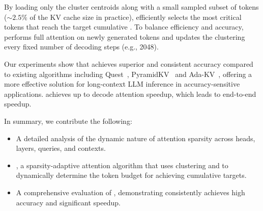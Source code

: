 By loading only the cluster centroids along with a small sampled subset of tokens ($\sim2.5\%$ of the KV cache size in practice), \sys efficiently selects the most critical tokens that reach the target cumulative \as{}. To balance efficiency and accuracy, \sys performs full attention on newly generated tokens and updates the clustering every fixed number of decoding steps (e.g., 2048).



Our experiments show that \sys achieves superior and consistent accuracy compared to existing algorithms including Quest~\cite{tang2024questqueryawaresparsityefficient}, PyramidKV~\cite{cai2024pyramidkvdynamickvcache} and Ada-KV~\cite{feng2024adakvoptimizingkvcache}, offering a more effective solution for long-context LLM inference in accuracy-sensitive applications. \sys achieves up to \attnspeedup decode attention speedup, which leads to \etoespeedup end-to-end speedup.

In summary, we contribute the following:
\begin{itemize}
    \item A detailed analysis of the dynamic nature of attention sparsity across heads, layers, queries, and contexts.
    \item \textbf{\sys}, a sparsity-adaptive attention algorithm that uses clustering and \df to dynamically determine the token budget for achieving cumulative \as{} targets. %
    \item A comprehensive evaluation of \sys{}, demonstrating \sys{} consistently achieves high accuracy and significant speedup.
\end{itemize}
